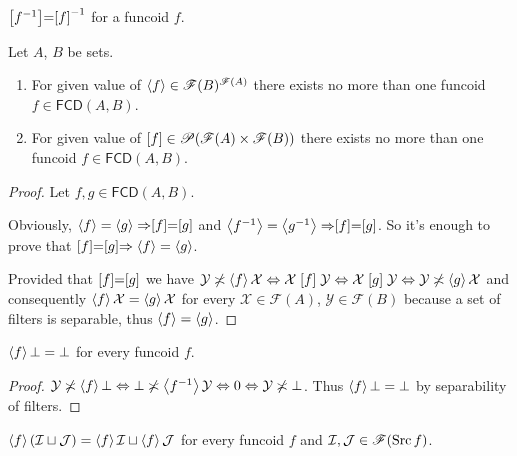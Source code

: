 \begin{obvious}
$\mathrel{\left[f^{-1}\right]}=\mathrel{\left[f\right]}^{-1}$ for a funcoid $f$.\end{obvious}
\begin{thm}
Let $A$, $B$ be sets.
\begin{enumerate}
\item For given value of $\left\langle f\right\rangle\in\mathscr{F}(B)^{\mathscr{F}(A)}$
there exists no more than one funcoid $f\in\mathsf{FCD}(A,B)$.
\item For given value of $\mathord{\mathrel{\left[f\right]}}\in\mathscr{P}(\mathscr{F}(A)\times\mathscr{F}(B))$
there exists no more than one funcoid $f\in\mathsf{FCD}(A,B)$.
\end{enumerate}
\end{thm}
\begin{proof}
Let $f,g\in\mathsf{FCD}(A,B)$.

Obviously, $\left\langle f\right\rangle=\left\langle g\right\rangle\Rightarrow\mathrel{\left[f\right]}=\mathrel{\left[g\right]}$ and
$\left\langle f^{-1}\right\rangle=\left\langle g^{-1}\right\rangle\Rightarrow\mathrel{\left[f\right]}=\mathrel{\left[g\right]}$.
So it's enough to prove that $\mathrel{\left[f\right]}=\mathrel{\left[g\right]}\Rightarrow\left\langle f\right\rangle=\left\langle g\right\rangle$.

Provided that $\mathrel{\left[f\right]}=\mathrel{\left[g\right]}$ we have $\mathcal{Y}\not\asymp\left\langle f\right\rangle\mathcal{X}\Leftrightarrow\mathcal{X}\mathrel{\left[f\right]}\mathcal{Y}\Leftrightarrow\mathcal{X}\mathrel{\left[g\right]}\mathcal{Y}\Leftrightarrow\mathcal{Y}\not\asymp\left\langle g\right\rangle\mathcal{X}$
and consequently $\left\langle f\right\rangle\mathcal{X}=\left\langle g\right\rangle\mathcal{X}$ for
every $\mathcal{X}\in\mathscr{F}(A)$, $\mathcal{Y}\in\mathscr{F}(B)$
because a set of filters is separable, thus $\left\langle f\right\rangle=\left\langle g\right\rangle$.\end{proof}
\begin{prop}
$\left\langle f\right\rangle\bot=\bot$
for every funcoid $f$.\end{prop}
\begin{proof}
$\mathcal{Y}\not\asymp\left\langle f\right\rangle\bot\Leftrightarrow\bot\not\asymp\left\langle f^{-1}\right\rangle\mathcal{Y}\Leftrightarrow0\Leftrightarrow\mathcal{Y}
\not\asymp\bot$.
Thus $\left\langle f\right\rangle\bot=\bot$
by separability of filters.\end{proof}
\begin{prop}
$\left\langle f\right\rangle(\mathcal{I}\sqcup\mathcal{J})=\left\langle f\right\rangle\mathcal{I}\sqcup\left\langle f\right\rangle\mathcal{J}$
for every funcoid $f$ and $\mathcal{I},\mathcal{J}\in\mathscr{F}(\operatorname{Src}
f)$.\end{prop}
